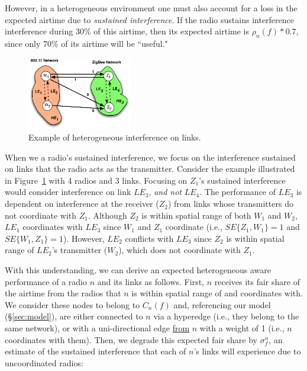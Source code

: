 \noindent However, in a heterogeneous environment one must also account for a loss in the expected airtime due to \emph{sustained interference}. If the radio sustains interference interference during 30\% of this airtime, then its expected airtime is $\rho_n(f) * 0.7$, since only 70\% of its airtime will be ``useful."

\begin{figure}[t]
\centering
\includegraphics[width=1.8in]{figures/linkexample}
\vspace{-0.2in}
\caption{\label{fig:linkexample} \small Example of heterogeneous interference on links.}
\center
\vspace{-0.1in}
\end{figure}

When we a radio's sustained interference, we focus on the interference sustained on links that the radio acts as the transmitter.  Consider the example illustrated in Figure~\ref{fig:linkexample} with 4 radios and 3 links.  Focusing on $Z_1$'s sustained interference would consider interference on link $LE_3$, \emph{and not} $LE_4$.   The performance of $LE_3$ is dependent on interference at the receiver ($Z_2$) from links whose transmitters do not coordinate with $Z_1$.  Although $Z_2$ is within spatial range of both $W_1$ and $W_2$, $LE_1$ coordinates with $LE_3$ since $W_1$ and $Z_1$ coordinate (i.e., $SE\{Z_1,W_1\}=1$ and $SE\{W_1,Z_1\}=1$).  However, $LE_2$ conflicts with $LE_3$ since $Z_2$ is within spatial range of $LE_2$'s transmitter ($W_2$), which does not coordinate with $Z_1$. 





With this understanding, we can derive an expected heterogeneous aware performance of a radio $n$ and its links as follows.  First, $n$ receives its fair share of the airtime from the radios that $n$ is within spatial range of and coordinates with.  We consider these nodes to belong to $C_n(f)$ and, referencing our model (\S\ref{sec:model}), are either connected to $n$ via a hyperedge (i.e., they belong to the same network), or with a uni-directional edge \uline{from} $n$ with a weight of 1 (i.e., $n$ coordinates with them).  Then, we degrade this expected fair share by $\sigma^n_f$, an estimate of the sustained interference that each of $n$'s links will experience due to uncoordinated radios:

